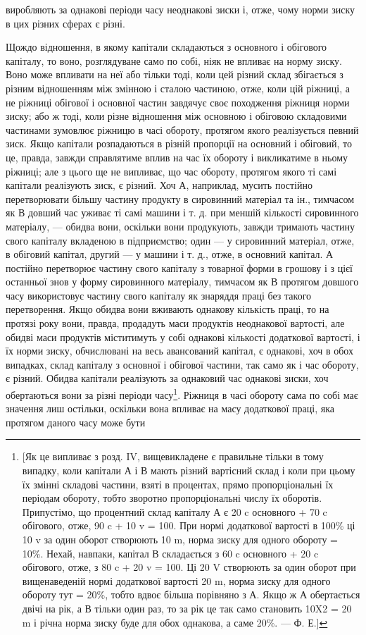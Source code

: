 \parcont{}  %
виробляють за однакові періоди часу неоднакові зиски і, отже,
чому норми зиску в цих різних сферах є різні.

Щождо відношення, в якому капітали складаються з основного і обігового капіталу, то воно,
розглядуване само по собі, ніяк не впливає на норму зиску. Воно може впливати на неї або тільки
тоді, коли цей різний склад збігається з різним відношенням між змінною і сталою частиною, отже,
коли цій ріжниці, а не ріжниці обігової і основної частин завдячує своє походження ріжниця норми
зиску; або ж тоді, коли різне відношення між основною і обіговою складовими частинами зумовлює
ріжницю в часі обороту, протягом якого реалізується певний зиск. Якщо капітали розпадаються в різній
пропорції на основний і обіговий, то це, правда, завжди справлятиме вплив
на час їх обороту і викликатиме в ньому ріжниці; але з цього
ще не випливає, що час обороту, протягом якого ті самі капітали реалізують зиск, є різний. Хоч А,
наприклад, мусить постійно перетворювати більшу частину продукту в сировинний матеріал та ін.,
тимчасом як В довший час уживає ті самі
машини і т. д. при меншій кількості сировинного матеріалу, — обидва вони, оскільки вони продукують,
завжди тримають
частину свого капіталу вкладеною в підприємство; один — у сировинний матеріал, отже, в обіговий
капітал, другий — у машини
і т. д., отже, в основний капітал. А постійно перетворює частину свого капіталу з товарної форми в
грошову і з цієї останньої знов у форму сировинного матеріалу, тимчасом як В протягом довшого часу
використовує частину свого капіталу як
знаряддя праці без такого перетворення. Якщо обидва вони
вживають однакову кількість праці, то на протязі року вони,
правда, продадуть маси продуктів неоднакової вартості, але
обидві маси продуктів міститимуть у собі однакові кількості
додаткової вартості, і їх норми зиску, обчислювані на весь авансований капітал, є однакові, хоч в
обох випадках, склад капіталу з
основної і обігової частини, так само як і час обороту, є різний.
Обидва капітали реалізують за однаковий час однакові зиски, хоч
обертаються вони за різні періоди часу\footnote{
[Як це випливає з розд. IV, вищевикладене є правильне тільки в тому
випадку, коли капітали А і В мають різний вартісний склад і коли при цьому
їх змінні складові частини, взяті в процентах, прямо пропорціональні їх періодам обороту, тобто
зворотно пропорціональні числу їх оборотів. Припустімо,
що процентний склад капіталу А є 20 c основного + 70 c обігового, отже,
90 c + 10 v = 100. При нормі додаткової вартості в 100\% ці 10 v за один оборот створюють 10 m, норма
зиску для одного обороту = 10\%. Нехай, навпаки, капітал В складається з 60 c основного + 20 c
обігового, отже, з 80 c + 20 v = 100.
Ці 20 V створюють за один оборот при вищенаведеній нормі додаткової вартості 20 m, норма зиску для
одного обороту тут = 20\%, тобто вдвоє більша
порівняно з А. Якщо ж А обертається двічі на рік, а В тільки один раз, то за
рік це так само становить 10X2 = 20 m і річна норма зиску буде для обох
однакова, а саме 20\%. — Ф. Е.]
}. Ріжниця в часі обороту
сама по собі має значення лиш остільки, оскільки вона впливає
на масу додаткової праці, яка протягом даного часу може бути
\parbreak{}  %
